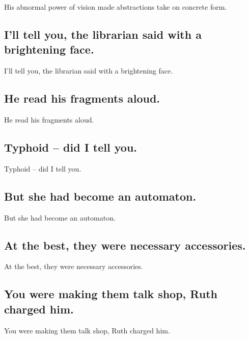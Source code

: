 \documentclass[]{article}
\begin{document}
His abnormal power of vision made abstractions take on concrete form.

\hypertarget{ill-tell-you-the-librarian-said-with-a-brightening-face.}{%
\subsection{I'll tell you, the librarian said with a brightening
face.}\label{ill-tell-you-the-librarian-said-with-a-brightening-face.}}

I'll tell you, the librarian said with a brightening face.

\hypertarget{he-read-his-fragments-aloud.}{%
\subsection{He read his fragments
aloud.}\label{he-read-his-fragments-aloud.}}

He read his fragments aloud.

\hypertarget{typhoid-did-i-tell-you.}{%
\subsection{Typhoid -- did I tell you.}\label{typhoid-did-i-tell-you.}}

Typhoid -- did I tell you.

\hypertarget{but-she-had-become-an-automaton.}{%
\subsection{But she had become an
automaton.}\label{but-she-had-become-an-automaton.}}

But she had become an automaton.

\hypertarget{at-the-best-they-were-necessary-accessories.}{%
\subsection{At the best, they were necessary
accessories.}\label{at-the-best-they-were-necessary-accessories.}}

At the best, they were necessary accessories.

\hypertarget{you-were-making-them-talk-shop-ruth-charged-him.}{%
\subsection{You were making them talk shop, Ruth charged
him.}\label{you-were-making-them-talk-shop-ruth-charged-him.}}

You were making them talk shop, Ruth charged him.
\end{document}
